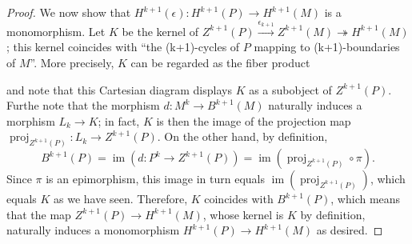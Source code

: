 \begin{proof}
    We now show that $H^{k+1}(\epsilon): H^{k+1}(P) \to H^{k+1}(M)$ is a monomorphism. Let $K$ be the kernel of $Z^{k+1}(P) \xrightarrow{\epsilon_{k+1}} Z^{k+1}(M) \twoheadrightarrow H^{k+1}(M)$; this kernel coincides with ``the (k+1)-cycles of $P$ mapping to (k+1)-boundaries of $M$''. More precisely, $K$ can be regarded as the fiber product
    \begin{center}
    \end{center}
    and note that this Cartesian diagram displays $K$ as a subobject of $Z^{k+1}(P)$. Furthe note that the morphism $d: M^k \to B^{k+1}(M)$ naturally induces a morphism $L_k \to K$; in fact, $K$ is then the image of the projection map $\operatorname{proj}_{Z^{k+1}(P)}: L_k \to Z^{k+1}(P)$. On the other hand, by definition, 
    $$B^{k+1}(P) = \operatorname{im}(d: P^k \to Z^{k+1}(P)) = \operatorname{im}(\operatorname{proj}_{Z^{k+1}(P)} \circ \pi).$$
    Since $\pi$ is an epimorphism, this image in turn equals $\operatorname{im}(\operatorname{proj}_{Z^{k+1}(P)})$, which equals $K$ as we have seen. Therefore, $K$ coincides with $B^{k+1}(P)$, which means that the map $Z^{k+1}(P) \to H^{k+1}(M)$, whose kernel is $K$ by definition, naturally induces a monomorphism $H^{k+1}(P) \to H^{k+1}(M)$ as desired.

\end{proof}
